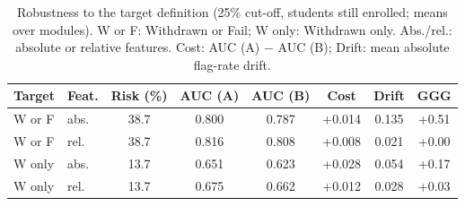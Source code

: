 \begin{table}[t]
\centering
\caption{Robustness to the target definition (25\% cut-off, students still enrolled; means over modules). W or F: Withdrawn or Fail; W only: Withdrawn only. Abs./rel.: absolute or relative features. Cost: AUC (A) $-$ AUC (B); Drift: mean absolute flag-rate drift.}
\label{tab:target}
\footnotesize
\setlength{\tabcolsep}{3pt}
\begin{tabular}{@{}llcccccc@{}}
\toprule
Target & Feat. & Risk (\%) & AUC (A) & AUC (B) & Cost & Drift & GGG \\
\midrule
W or F & abs. & 38.7 & 0.800 & 0.787 & +0.014 & 0.135 & +0.51 \\
W or F & rel. & 38.7 & 0.816 & 0.808 & +0.008 & 0.021 & +0.00 \\
W only & abs. & 13.7 & 0.651 & 0.623 & +0.028 & 0.054 & +0.17 \\
W only & rel. & 13.7 & 0.675 & 0.662 & +0.012 & 0.028 & +0.03 \\
\bottomrule
\end{tabular}
\end{table}
